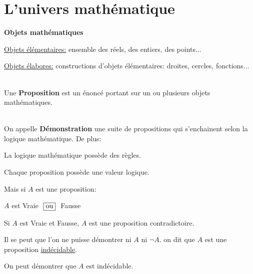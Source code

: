 \documentclass[12pt,twoside,a4paper]{article}
\author{MPSI 2}
\begin{document}
	\maketitle
	\section{L'univers math\'ematique}
		\begin{liste}
			\item\textbf{Objets math\'ematiques}
				\begin{tab}\begin{liste}
					\item \underline{Objets \'el\'ementaires:} ensemble des r\'eels, des entiers, des points...
					\item \underline{Objets \'elabores:} constructions d'objets \'el\'ementaires: droites, cercles, fonctions...\\\\
				\end{liste}\end{tab}
			\item Une \textbf{Proposition} est un \'enonc\'e portant sur un ou plusieurs objets math\'ematiques.\\\\
			\item On appelle \textbf{D\'emonstration} une suite de propositions qui s'enchainent selon la logique math\'ematique. De plus:
				\begin{liste}
					\item La logique math\'ematique poss\`ede des r\`egles.
					\item Chaque proposition poss\`ede une valeur logique.\\
				\end{liste}
				Mais si $A$ est une proposition:
				\begin{liste}
					\item $A$ est Vraie $\ \fbox{\text{ou}}\ $ Fausse
					\item Si $A$ est Vraie et Fausse, $A$ est une proposition contradictoire.
					\item Il se peut que l'on ne puisse d\'emontrer ni $A$ ni $\neg A$. on dit que $A$ est une proposition \underline{ind\'ecidable}.
					\item On peut d\'emontrer que $A$ est ind\'ecidable.
				\end{liste}
		\end{liste}
\end{document}
